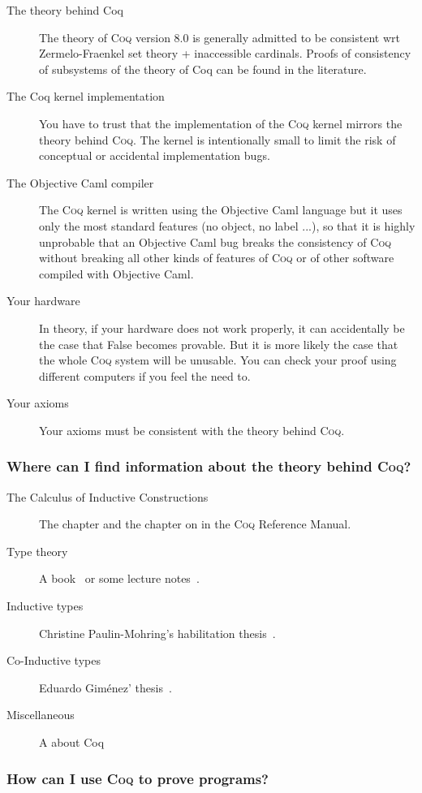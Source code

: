 \documentclass[a4paper,pdftex]{article}
\def\Question#1{\stepcounter{question}\subsubsection{#1}}
\def\Coq{\textsc{Coq}}
\begin{document}
\begin{description}
\item[The theory behind Coq] The theory of {\Coq} version 8.0 is
generally admitted to be consistent wrt Zermelo-Fraenkel set theory +
inaccessible cardinals. Proofs of consistency of subsystems of the
theory of Coq can be found in the literature.
\item[The Coq kernel implementation] You have to trust that the
implementation of the {\Coq} kernel mirrors the theory behind {\Coq}. The
kernel is intentionally small to limit the risk of conceptual or
accidental implementation bugs.
\item[The Objective Caml compiler] The {\Coq} kernel is written using the
Objective Caml language but it uses only the most standard features
(no object, no label ...), so that it is highly unprobable that an
Objective Caml bug breaks the consistency of {\Coq} without breaking all
other kinds of features of {\Coq} or of other software compiled with
Objective Caml.
\item[Your hardware] In theory, if your hardware does not work
properly, it can accidentally be the case that False becomes
provable. But it is more likely the case that the whole {\Coq} system
will be unusable. You can check your proof using different computers
if you feel the need to.
\item[Your axioms] Your axioms must be consistent with the theory
behind {\Coq}.
\end{description}


\Question{Where can I find information about the theory behind {\Coq}?}
\begin{description}
\item[The Calculus of Inductive Constructions] The
chapter and the chapter on
 in
the {\Coq} Reference Manual.
\item[Type theory] A book~\cite{ProofsTypes} or some lecture
notes~\cite{Types:Dowek}.
\item[Inductive types]
Christine Paulin-Mohring's habilitation thesis~\cite{Pau96b}.
\item[Co-Inductive types]
Eduardo Giménez' thesis~\cite{EGThese}.
\item[Miscellaneous] A
 about Coq
\end{description}


\Question{How can I use {\Coq} to prove programs?}
\end{document}
